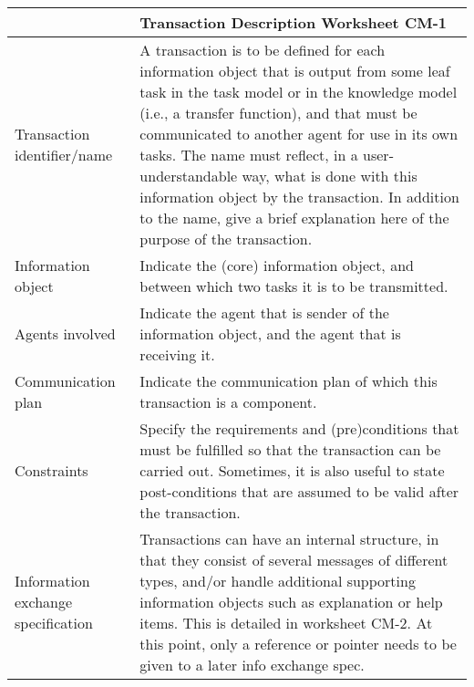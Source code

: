 \begin{tabular}{%
       |>{\colleft}p{3cm}%
       |>{\colleft}p{8.5cm}|}
\hline
{\bf Communication model} &
   {\bf Transaction Description Worksheet CM-1} \\
\hline
\hline
\sc Transaction identifier/name &
   {\rm
   A transaction is to be defined for each information object that is
   output from some leaf task in the task model or in the knowledge
   model (i.e., a transfer function), and that must be communicated to
   another agent for use in its own tasks. The name must reflect, in a
   user-understandable way, what is done with this information object
   by the transaction. In addition to the name, give a brief
   explanation here of the purpose of the transaction.
   } \\
\hline
\sc Information object &
   {\rm
   Indicate the (core) information object, and between which two
   tasks it is to be transmitted.
   } \\
\hline
\sc Agents involved &
   {\rm
   Indicate the agent that is sender of the information object,
   and the agent that is receiving it.
   } \\
\hline
\sc Communication plan &
   {\rm
   Indicate the communication plan of which this transaction is a
   component.
   } \\
\hline
\sc Constraints &
   {\rm
   Specify the requirements and (pre)conditions that must be fulfilled
   so that the transaction can be carried out. Sometimes, it is also
   useful to state post-conditions that are assumed to be valid after
   the transaction.
   } \\
\hline
\sc Information exchange specification &
   {\rm
   Transactions can have an internal structure, in that they consist
   of several messages of different types, and/or handle additional
   supporting information objects such as explanation or help items.
   This is detailed in worksheet CM-2. At this point, only a reference
   or pointer needs to be given to a later info exchange spec.
   } \\
\hline
\end{tabular}
